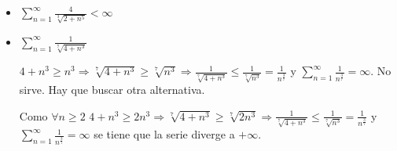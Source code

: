 \begin{example}
\begin{itemize}
		\item \(\sum_{n =1}^{\infty} \frac{4}{\sqrt[3]{2 + n^{5} } } < \infty\)
		\item \(\sum_{n =1}^{\infty} \frac{1}{\sqrt[7]{4 + n^{3} } }\)
		      
		      \(4 + n^{3} \geq n^{3} \Rightarrow \sqrt[7]{4 + n^{3} } \geq \sqrt[7]{n^{3} } \Rightarrow \frac{1}{\sqrt[7]{4 + n^{3} } } \leq \frac{1}{\sqrt[7]{n^{3} } } = \frac{1}{n^{\frac{3}{7}} }\) y \(\sum_{n =1}^{\infty} \frac{1}{n^{\frac{3}{7}}  } = \infty\). No sirve. Hay que buscar otra alternativa.
		      
		      Como \(\forall n \geq  2\) \(4 + n^{3} \geq 2n^{3} \Rightarrow \sqrt[7]{4 + n^{3} } \geq \sqrt[7]{2n^{3} } \Rightarrow \frac{1}{\sqrt[7]{4 + n^{3} } } \leq \frac{1}{\sqrt[7]{n^{3} } } = \frac{1}{n^{\frac{3}{7}} }\) y \(\sum_{n =1}^{\infty} \frac{1}{n^{\frac{3}{7}}  } = \infty\) se tiene que la serie diverge a \(+\infty \).
		      
		      
	\end{itemize}
\end{example}

